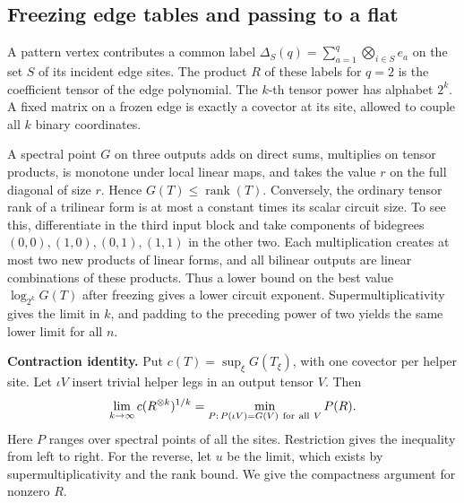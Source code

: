 \documentclass[11pt,letterpaper]{article}
\begin{document}
\subsection{Freezing edge tables and passing to a flat}\label{freezing-edge-tables-and-passing-to-a-flat}

A pattern vertex contributes a common label \(\Delta_S(q)=\sum_{a=1}^q\bigotimes_{i\in S} e_a\) on the set \(S\) of its incident edge sites. The product \(R\) of these labels for \(q=2\) is the coefficient tensor of the edge polynomial. The \(k\)-th tensor power has alphabet \(2^k\). A fixed matrix on a frozen edge is exactly a covector at its site, allowed to couple all \(k\) binary coordinates.

A spectral point \(G\) on three outputs adds on direct sums, multiplies on tensor products, is monotone under local linear maps, and takes the value \(r\) on the full diagonal of size \(r\). Hence \(G(T)\le\operatorname{rank}(T)\). Conversely, the ordinary tensor rank of a trilinear form is at most a constant times its scalar circuit size. To see this, differentiate in the third input block and take components of bidegrees \((0,0),(1,0),(0,1),(1,1)\) in the other two. Each multiplication creates at most two new products of linear forms, and all bilinear outputs are linear combinations of these products. Thus a lower bound on the best value \(\log_{2^k}G(T)\) after freezing gives a lower circuit exponent. Supermultiplicativity gives the limit in \(k\), and padding to the preceding power of two yields the same lower limit for all \(n\).

\textbf{Contraction identity.} Put \(c(T)=\sup_\xi G(T_\xi)\), with one covector per helper site. Let \(\iota V\) insert trivial helper legs in an output tensor \(V\). Then
\[
 \lim_{k\to\infty}c(R^{\otimes k})^{1/k}
     =\min_{P:\,P(\iota V)=G(V)\ {\rm for\ all}\ V}P(R).
\]
Here \(P\) ranges over spectral points of all the sites. Restriction gives the inequality from left to right. For the reverse, let \(u\) be the limit, which exists by supermultiplicativity and the rank bound. We give the compactness argument for nonzero \(R\).
\end{document}
